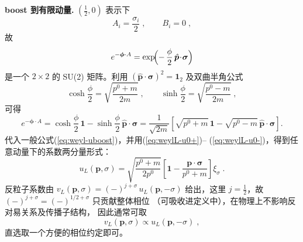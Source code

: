 \medskip
\noindent\textbf{boost 到有限动量.}
$(\tfrac12,0)$ 表示下
\[
  A_i = \frac{\sigma_i}{2}\;,\qquad B_i=0\;,
\]
故
\[
  e^{-\boldsymbol{\phi}\cdot A}
  = \exp\!\Bigl(-\,\frac{\phi}{2}\,\hat{\boldsymbol{p}}\!\cdot\!\boldsymbol{\sigma}\Bigr)
\]
是一个 $2\times2$ 的 SU(2) 矩阵。利用
\((\hat{\boldsymbol{p}}\!\cdot\!\boldsymbol{\sigma})^{2}=\mathbf{1}_{2}\)
及双曲半角公式
\[
  \cosh\frac{\phi}{2}
  = \sqrt{\frac{p^{0}+m}{2m}}\;,\qquad
  \sinh\frac{\phi}{2}
  = \sqrt{\frac{p^{0}-m}{2m}}\;,
\]
可得
\begin{equation}\label{eq:weylL-boost-matrix}
  e^{-\boldsymbol{\phi}\cdot A}
  = \cosh\frac{\phi}{2}\,\mathbf{1}
    - \sinh\frac{\phi}{2}\,\hat{\boldsymbol{p}}\!\cdot\!\boldsymbol{\sigma}
  = \frac{1}{\sqrt{2m}}
    \left[\sqrt{p^{0}+m}\,\mathbf{1}
          -\sqrt{p^{0}-m}\,\hat{\boldsymbol{p}}\!\cdot\!\boldsymbol{\sigma}\right].
\end{equation}
代入一般公式(\ref{eq:weyl-uboost})，并用(\ref{eq:weylL-u0+})–
(\ref{eq:weylL-u0-})，得到任意动量下的系数两分量形式：
\begin{equation}\label{eq:weylL-u}
  u_{L}(\boldsymbol{p},\sigma)
  = \sqrt{\frac{p^{0}+m}{2p^{0}}}
    \left[\mathbf{1}
          -\frac{\boldsymbol{p}\!\cdot\!\boldsymbol{\sigma}}{p^{0}+m}\right]\xi_{\sigma}\;.
\end{equation}
反粒子系数由
$v_{L}(\boldsymbol{p},\sigma)=(-)^{j+\sigma}\,u_{L}(\boldsymbol{p},-\sigma)$
给出，这里 $j=\tfrac12$，故 $(-)^{j+\sigma} = (-)^{1/2+\sigma}$ 只贡献整体相位
（可吸收进定义中），在物理上不影响反对易关系及传播子结构，
因此通常可取
\begin{equation}\label{eq:weylL-v}
  v_{L}(\boldsymbol{p},\sigma)
  \propto u_{L}(\boldsymbol{p},-\sigma)\;,
\end{equation}
直选取一个方便的相位约定即可。

